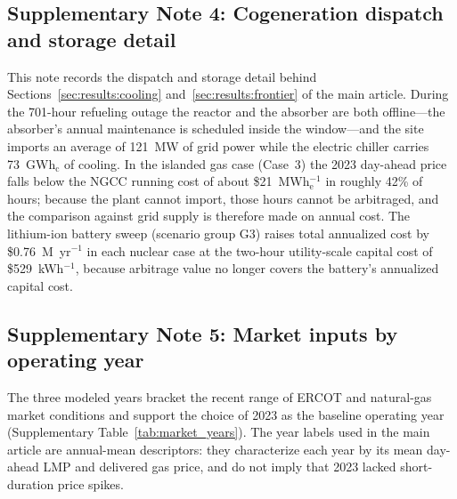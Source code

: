 \documentclass[a4paper,fleqn]{cas-sc}
\begin{document}
\subsection*{Supplementary Note 4: Cogeneration dispatch and storage detail}\label{note:dispatch}
This note records the dispatch and storage detail behind Sections~\ref{sec:results:cooling} and~\ref{sec:results:frontier} of the main article. During the 701-hour refueling outage the reactor and the absorber are both offline---the absorber's annual maintenance is scheduled inside the window---and the site imports an average of 121~MW of grid power while the electric chiller carries 73~GWh$_\mathrm{c}$ of cooling. In the islanded gas case (Case~3) the 2023 day-ahead price falls below the NGCC running cost of about \$21~MWh$_\mathrm{e}^{-1}$ in roughly 42\% of hours; because the plant cannot import, those hours cannot be arbitraged, and the comparison against grid supply is therefore made on annual cost. The lithium-ion battery sweep (scenario group G3) raises total annualized cost by \$0.76~M~yr$^{-1}$ in each nuclear case at the two-hour utility-scale capital cost of \$529~kWh$^{-1}$, because arbitrage value no longer covers the battery's annualized capital cost.

\subsection*{Supplementary Note 5: Market inputs by operating year}\label{note:market}
The three modeled years bracket the recent range of ERCOT and natural-gas market conditions and support the choice of 2023 as the baseline operating year (Supplementary Table~\ref{tab:market_years}). The year labels used in the main article are annual-mean descriptors: they characterize each year by its mean day-ahead LMP and delivered gas price, and do not imply that 2023 lacked short-duration price spikes.
\end{document}
